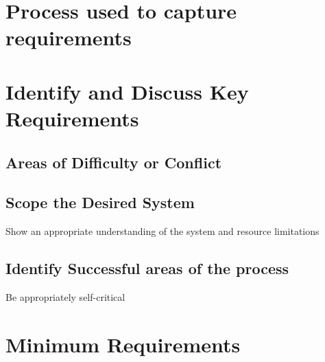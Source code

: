 \section{Process used to capture requirements}

\section{Identify and Discuss Key Requirements}

\subsection{Areas of Difficulty or Conflict}

\subsection{Scope the Desired System}
Show an appropriate understanding of the system and resource limitations

\subsection{Identify Successful areas of the process}
Be appropriately self-critical

\section{Minimum Requirements}
